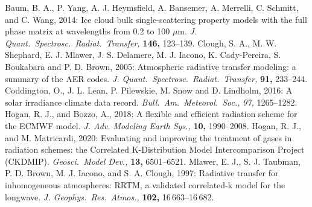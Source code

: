 \documentclass[twoside]{article}
\begin{document}
\begin{thebibliography}{00}
%
Baum, B. A., P. Yang,
A. J. Heymsfield, A. Bansemer, A. Merrelli, C. Schmitt, and C. Wang,
2014: Ice cloud bulk single-scattering property models with the full
phase matrix at wavelengths from 0.2 to 100
$\mu$m. \textit{J. Quant.\ Spectrosc.\ Radiat.\ Transfer,}
\textbf{146,} 123--139.
%
Clough, S. A.,
M. W. Shephard, E. J. Mlawer, J. S. Delamere, M. J. Iacono,
K. Cady-Pereira, S. Boukabara and P. D. Brown, 2005: Atmospheric
radiative transfer modeling: a summary of the AER
codes. \textit{J. Quant.\ Spectrosc.\ Radiat.\ Transfer,} \textbf{91,}
233--244.
%
Coddington, O.,
  J. L. Lean, P. Pilewskie, M. Snow and D. Lindholm, 2016: A solar
  irradiance climate data
  record. \textit{Bull.\ Am.\ Meteorol.\ Soc.,} \textit{97,}
  1265--1282.
%
Hogan, R. J., and Bozzo,
  A., 2018: A flexible and efficient radiation scheme for the ECMWF
  model. \textit{J. Adv. Modeling Earth Sys.,} \textbf{10,}
  1990--2008.
%
Hogan, R. J., and
M. Matricardi, 2020: Evaluating and improving the treatment of gases
in radiation schemes: the Correlated K-Distribution Model
Intercomparison Project (CKDMIP). \textit{Geosci.\ Model Dev.,}
\textbf{13,} 6501--6521.
%
 Mlawer, E. J.,
S. J. Taubman, P. D. Brown, M. J. Iacono, and S. A. Clough, 1997:
Radiative transfer for inhomogeneous atmospheres: RRTM, a validated
correlated-k model for the longwave.  \textit{J. Geophys.\ Res.\ Atmos.,}
\textbf{102,} 16\,663--16\,682.
%
\end{thebibliography}
\end{document}
